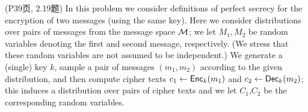 \begin{questions}
\begin{parts}
        \end{parts}

    \question (P39页, 2.19题) In this problem we consider definitions of perfect secrecy for the encryption of two messages (using the same key). Here we consider distributions over pairs of messages from the message space $\mathcal{M}$; we let $M_1,M_2$ be random variables denoting the first and second message, respectively. (We stress that these random variables are not assumed to be independent.) We generate a (single) key $k$, sample a pair of messages $(m_1,m_2)$ according to the given distribution, and then compute cipher texts $c_1\leftarrow\mathsf{Enc}_k(m_1)$ and $c_2\leftarrow\mathsf{Dec}_k(m_2)$; this induces a distribution over pairs of cipher texts and we let $C_1$,$C_2$ be the corresponding random variables.
\end{questions}
